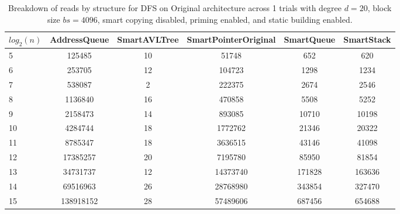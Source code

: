 \begin{table}[]
\centering
\begin{tabular}{|l|c|c|c|c|c|}
$log_2(n)$ & AddressQueue & SmartAVLTree & SmartPointerOriginal & SmartQueue & SmartStack \\ \hline
5 & 125485 & 10 & 51748 & 652 & 620 \\ \hline
6 & 253705 & 12 & 104723 & 1298 & 1234 \\ \hline
7 & 538087 & 2 & 222375 & 2674 & 2546 \\ \hline
8 & 1136840 & 16 & 470858 & 5508 & 5252 \\ \hline
9 & 2158473 & 14 & 893085 & 10710 & 10198 \\ \hline
10 & 4284744 & 18 & 1772762 & 21346 & 20322 \\ \hline
11 & 8785347 & 18 & 3636515 & 43146 & 41098 \\ \hline
12 & 17385257 & 20 & 7195780 & 85950 & 81854 \\ \hline
13 & 34731737 & 12 & 14373740 & 171828 & 163636 \\ \hline
14 & 69516963 & 26 & 28768980 & 343854 & 327470 \\ \hline
15 & 138918152 & 28 & 57489606 & 687456 & 654688 \\ \hline
\end{tabular}
\caption{Breakdown of reads by structure for DFS on Original architecture across 1 trials with degree $d=20$, block size $bs=4096$, smart copying disabled, priming enabled, and static building enabled.}
    \label{tab:reads_by_structure_dfs_d20_bs4096_trials1_copiesfalse_primetrue_staticinsertiontrue_ptoriginal_movefalse}
\end{table}

